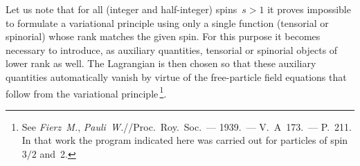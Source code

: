 Let us note that for all (integer and half-integer) spins~$s > 1$ it proves impossible to formulate a variational principle using only a single function (tensorial or spinorial) whose rank matches the given spin. For this purpose it becomes necessary to introduce, as auxiliary quantities, tensorial or spinorial objects of lower rank as well. The Lagrangian is then chosen so that these auxiliary quantities automatically vanish by virtue of the free-particle field equations that follow from the variational principle\,\footnote{See \emph{Fierz~M.}, \emph{Pauli~W.}//Proc.\ Roy.\ Soc.~--- 1939.~--- V.~A~173.~--- P.~211. In that work the program indicated here was carried out for particles of spin~$3/2$ and~2.}.
